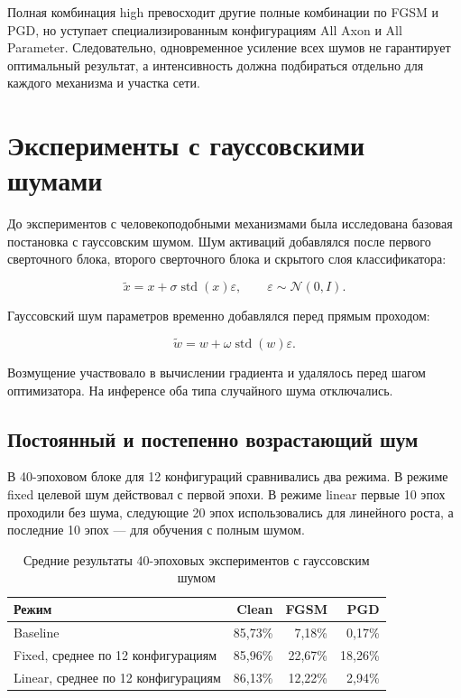 \documentclass[a4paper]{article}
\begin{document}
Полная комбинация high превосходит другие полные комбинации по FGSM и PGD, но уступает специализированным конфигурациям All Axon и All Parameter. Следовательно, одновременное усиление всех шумов не гарантирует оптимальный результат, а интенсивность должна подбираться отдельно для каждого механизма и участка сети.

\section{Эксперименты с гауссовскими шумами}

До экспериментов с человекоподобными механизмами была исследована базовая постановка с гауссовским шумом. Шум активаций добавлялся после первого сверточного блока, второго сверточного блока и скрытого слоя классификатора:

\begin{equation}
\widetilde{x}=x+\sigma\operatorname{std}(x)\varepsilon,
\qquad \varepsilon\sim\mathcal{N}(0,I).
\end{equation}

Гауссовский шум параметров временно добавлялся перед прямым проходом:

\begin{equation}
\widetilde{w}=w+\omega\operatorname{std}(w)\varepsilon.
\end{equation}

Возмущение участвовало в вычислении градиента и удалялось перед шагом оптимизатора. На инференсе оба типа случайного шума отключались.

\subsection{Постоянный и постепенно возрастающий шум}

В 40-эпоховом блоке для 12 конфигураций сравнивались два режима. В режиме fixed целевой шум действовал с первой эпохи. В режиме linear первые 10 эпох проходили без шума, следующие 20 эпох использовались для линейного роста, а последние 10 эпох --- для обучения с полным шумом.

\begin{table}[H]
\centering
\begin{tabular}{lrrr}
\toprule
Режим & Clean & FGSM & PGD\\
\midrule
Baseline & 85{,}73\% & 7{,}18\% & 0{,}17\%\\
Fixed, среднее по 12 конфигурациям & 85{,}96\% & 22{,}67\% & 18{,}26\%\\
Linear, среднее по 12 конфигурациям & 86{,}13\% & 12{,}22\% & 2{,}94\%\\
\bottomrule
\end{tabular}
\caption{Средние результаты 40-эпоховых экспериментов с гауссовским шумом}
\label{tab:gaussian-average}
\end{table}
\end{document}

